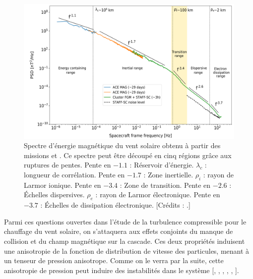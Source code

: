 \begin{figure}[!ht]
 \centering
\includegraphics[width=\linewidth,trim=0.5cm 0cm 0cm 0cm, clip=true]{./Mainmatter/Part_0/images/spectre_SW}
\cprotect\caption{Spectre d'énergie magnétique du vent solaire obtenu à partir des missions  et . Ce spectre peut être découpé en cinq régions grâce aux ruptures de pentes. Pente en $-1.1$ : Réservoir d'énergie. $\lambda_c$ : longueur de corrélation. Pente en $-1.7$ : Zone inertielle. $\rho_i$ : rayon de Larmor ionique. Pente en $-3.4$ : Zone de transition. Pente en $-2.6$ : Échelles dispersives. $\rho_e$ : rayon de Larmor électronique. Pente en $-3.7$ : Échelles de dissipation électronique. [Crédits : \cite{sahraoui_magnetohydrodynamic_2020}.]}
\label{fig:spectre_SW}
\end{figure}

Parmi ces questions ouvertes dans l'étude de la turbulence compressible pour le chauffage du vent solaire, on s'attaquera aux effets conjoints du manque de collision et du champ magnétique sur la cascade. Ces deux propriétés induisent une anisotropie de la fonction de distribution de vitesse des particules, menant à un tenseur de pression anisotrope. Comme on le verra par la suite, cette anisotropie de pression peut induire des instabilités dans le système [\cite{parker_dynamical_1958}, \cite{berezin_firehose_1976}, \cite{hall_firehose_1981}, \cite{southwood_mirror_1993}, \cite{gary_proton_1976}, \cite{hunana_introductory_2019}]. 

